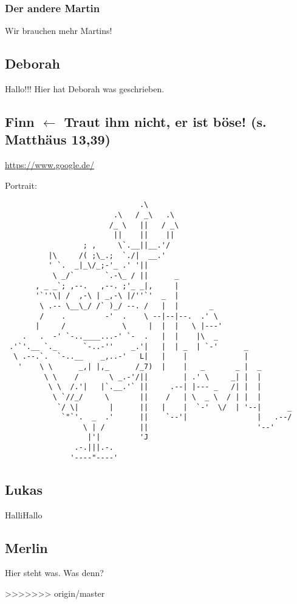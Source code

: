 \documentclass[12pt]{scrartcl}
\begin{document}
\subsubsection{Der andere Martin}
Wir brauchen mehr Martins!

\subsection{Deborah}
Hallo!!! Hier hat Deborah was geschrieben.

\newpage
\subsection{Finn $\leftarrow$ Traut ihm nicht, er ist böse! (s. Matthäus 13,39)}
\url{https://www.google.de/}

Portrait:
\begin{verbatim}
                               .\
                         .\   / _\   .\
                        /_ \   ||   / _\
                         ||    ||    ||
                  ; ,     \`.__||__.'/
          |\     /( ;\_.;  `./|  __.'
          ' `.  _|_\/_;-'_ .' '||
           \ _/`       `.-\_ / ||      _
       , _ _`; ,--.   ,--. ;'_ _|,     |
       '`''\| /  ,-\ | _,-\ |/''`'  _  |
        \ .-- \__\_/ /` )_/ --. /   |  |       _
        /    .         -'  .    \ --|--|--.  .' \
       |     /             \     |  |  |   \ |---'
    .   .  -' `-..____...-' `-  .   |  |    |\  _
 .'`'.__ `._      `-..-''    _.'|   |  | _  | `-'      _
  \ .--.`.  `-..__    _,..-'   L|   |    |             |
   '    \ \      _,| |,_      /_7)  |    |   _       _ |  _
         \ \    /       \ _.-'/||        | .' \     _| |  |
          \ \  /.'|   |`.__.'` ||     .--| |--- _   /| |  |
           \ `//_/     \       ||    /   | \  _ \  / | |  |
            `/ \|       |      ||   |    |  `-'  \/  | '--|      _
             `"`'.  _  .'      ||    `--'|                |   .--/
                  \ | /        ||                         '--'
                   |'|         'J
                .-.|||.-.
               '----"----' 
\end{verbatim}
\subsection{Lukas}
HalliHallo


\subsection{Merlin}
Hier steht was.
Was denn?

>>>>>>> origin/master
\end{document}
